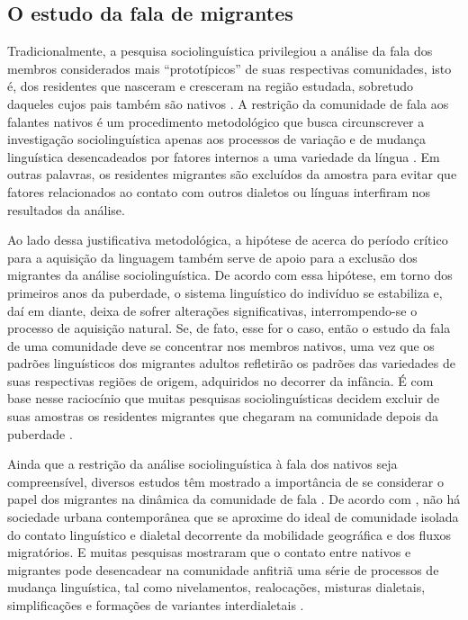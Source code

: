 \documentclass[
	a4paper,	%
	12pt,		%
	]{article}	%
\begin{document}
	\subsection{O estudo da fala de migrantes}

	Tradicionalmente, a pesquisa sociolinguística privilegiou a análise da fala dos membros
	considerados mais \enquote{prototípicos} de suas respectivas comunidades, isto é, dos residentes que
	nasceram e cresceram na região estudada, sobretudo daqueles cujos pais também são nativos
	\citep{Britain2018, Oushiro2016, Milroy2002, Kerswill1993}. A restrição da comunidade de fala
	aos falantes nativos é um procedimento metodológico que busca circunscrever a investigação
	sociolinguística apenas aos processos de variação e de mudança linguística desencadeados por
	fatores internos a uma variedade da língua \citep[][p.  20]{Milroy2002, Labov2001}. Em outras
	palavras, os residentes migrantes são excluídos da amostra para evitar que fatores relacionados
	ao contato com outros dialetos ou línguas interfiram nos resultados da análise.

	Ao lado dessa justificativa metodológica, a hipótese de \citet{Lenneberg1967} acerca do período
	crítico para a aquisição da linguagem também serve de apoio para a exclusão dos migrantes da
	análise sociolinguística. De acordo com essa hipótese, em torno dos primeiros anos da puberdade,
	o sistema linguístico do indivíduo se estabiliza e, daí em diante, deixa de sofrer alterações
	significativas, interrompendo-se o processo de aquisição natural. Se, de fato, esse for o caso,
	então o estudo da fala de uma comunidade deve se concentrar nos membros nativos, uma vez que os
	padrões linguísticos dos migrantes adultos refletirão os padrões das variedades de suas
	respectivas regiões de origem, adquiridos no decorrer da infância. É com base nesse raciocínio
	que muitas pesquisas sociolinguísticas decidem excluir de suas amostras os residentes migrantes
	que chegaram na comunidade depois da puberdade \citep[p. ex.][p.  111]{Labov1966}.

	Ainda que a restrição da análise sociolinguística à fala dos nativos seja compreensível,
	diversos estudos têm mostrado a importância de se considerar o papel dos migrantes na dinâmica
	da comunidade de fala \citep{Britain2018, Bortoni-Ricardo2011, Trudgill1986}. De acordo com
	\citet{Milroy2002}, não há sociedade urbana contemporânea que se aproxime do ideal de comunidade
	isolada do contato linguístico e dialetal decorrente da mobilidade geográfica e dos fluxos
	migratórios. E muitas pesquisas mostraram que o contato entre nativos e migrantes pode
	desencadear na comunidade anfitriã uma série de processos de mudança linguística, tal como
	nivelamentos, realocações, misturas dialetais, simplificações e formações de variantes
	interdialetais \citep{Trudgill1986}.
\end{document}
